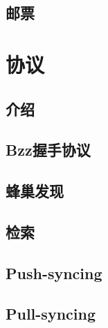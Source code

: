 \section{邮票\statusorange}\label{spec:format:postage-stamps}

%


\chapter{协议}\label{spec:protocol}

\section{介绍\statusorange}\label{spec:protocol:intro}


\section{Bzz握手协议}\label{spec:protocol:bzz}


\section{蜂巢发现\statusgreen}\label{spec:protocol:hive}


\section{检索\statusorange}\label{spec:protocol:retrieval}


\section{Push-syncing \statusorange}\label{spec:protocol:push-sync}


\section{Pull-syncing \statusorange}\label{spec:protocol:pull-sync}


